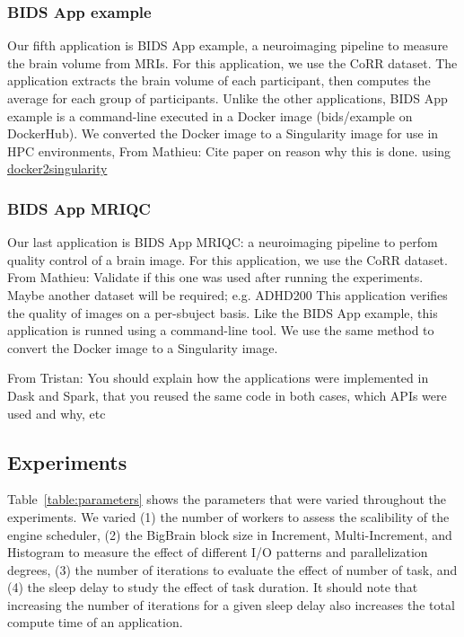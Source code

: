 \documentclass[conference]{IEEEtran}
\newcommand{\TG}[1]{\color{cyan}From Tristan: #1 \color{black}}
\newcommand{\MD}[1]{\color{magenta}From Mathieu: #1 \color{black}}
\begin{document}
	
\subsubsection{BIDS App example}
Our fifth application is BIDS App example, a neuroimaging pipeline to
measure the brain volume from MRIs. For this application, we use the CoRR
dataset. The application extracts the brain volume of each participant,
then computes the average for each group of participants. Unlike the other
applications, BIDS App example is a command-line executed in a Docker image
(bids/example on DockerHub). We converted the Docker image to a Singularity
image for use in HPC environments, \MD{Cite paper on reason why this is
done.} using
\href{https://hub.docker.com/r/singularityware/docker2singularity/tags/}{docker2singularity}

\subsubsection{BIDS App MRIQC}
Our last application is BIDS App MRIQC: a neuroimaging pipeline to perfom quality control of a brain image.
For this application, we use the CoRR dataset. \MD{Validate if this one was used after running the experiments. Maybe another dataset will be required; e.g. ADHD200}
This application verifies the quality of images on a per-sbuject basis.
Like the BIDS App example, this application is runned using a command-line tool.
We use the same method to convert the Docker image to a Singularity image.

\TG{You should explain how the applications were implemented in Dask and
Spark, that you reused the same code in both  cases, which APIs were used 
and why, etc}

\subsection{Experiments}
Table~\ref{table:parameters} shows the parameters that were varied
throughout the experiments. We varied (1) the number of workers to assess
the scalibility of the engine scheduler, (2) the BigBrain
block size in Increment, Multi-Increment, and Histogram to measure the
effect of different I/O patterns and parallelization degrees, (3) the
number of iterations to evaluate the effect of number of task, and (4) the
sleep delay to study the effect of task duration. It should note that
increasing the number of iterations for a given sleep delay also increases
the total compute time of an application.
\end{document}
